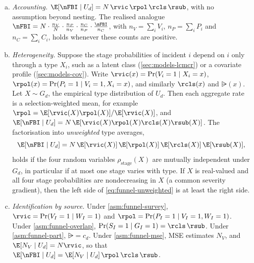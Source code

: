 \begin{proposition}\label{prop:funnel}
\leavevmode
\begin{enumerate}[(a)]
  \item \emph{Accounting.} $\E[\nFBI\mid U_d]=N\,\rvic\,\rpol\,\rcls\,\rsub$, with no assumption beyond nesting. The realised analogue $\nFBI=N\cdot\frac{n_V}{N}\cdot\frac{n_P}{n_V}\cdot\frac{n_C}{n_P}\cdot\frac{\nFBI}{n_C}$, with $n_V=\sum_iV_i$, $n_P=\sum_iP_i$ and $n_C=\sum_iC_i$, holds whenever these counts are positive.
  \item \emph{Heterogeneity.} Suppose the stage probabilities of incident $i$ depend on $i$ only through a type $X_i$, such as a latent class (\cref{sec:models-lcmcr}) or a covariate profile (\cref{sec:models-cov}). Write $\rvic(x)=\Pr(V_i=1\mid X_i=x)$, $\rpol(x)=\Pr(P_i=1\mid V_i=1,X_i=x)$, and similarly $\rcls(x)$ and $\rsub(x)$. Let $X\sim G_d$, the empirical type distribution of $U_d$. Then each aggregate rate is a selection-weighted mean, for example $\rpol=\E[\rvic(X)\rpol(X)]/\E[\rvic(X)]$, and $\E[\nFBI\mid U_d]=N\,\E[\rvic(X)\rpol(X)\rcls(X)\rsub(X)]$. The factorisation into \emph{unweighted} type averages,
  \begin{equation}\label{eq:funnel-unweighted}
    \E[\nFBI\mid U_d]=N\,\E[\rvic(X)]\,\E[\rpol(X)]\,\E[\rcls(X)]\,\E[\rsub(X)],
  \end{equation}
  holds if the four random variables $\rho_{\mathrm{stage}}(X)$ are mutually independent under $G_d$, in particular if at most one stage varies with type. If $X$ is real-valued and all four stage probabilities are nondecreasing in $X$ (a common severity gradient), then the left side of \eqref{eq:funnel-unweighted} is at least the right side.
  \item \emph{Identification by source.} Under \ref{asm:funnel-survey}, $\rvic=\Pr(V_I=1\mid W_I=1)$ and $\rpol=\Pr(P_I=1\mid V_I=1,W_I=1)$. Under \ref{asm:funnel-overlap}, $\Pr(S_I=1\mid G_I=1)=\rcls\,\rsub$. Under \ref{asm:funnel-part}, $\rsub=c_d$. Under \ref{asm:funnel-mse}, MSE estimates $N_V$, and $\E[N_V\mid U_d]=N\rvic$, so that $\E[\nFBI\mid U_d]=\E[N_V\mid U_d]\,\rpol\,\rcls\,\rsub$.
\end{enumerate}
\end{proposition}

